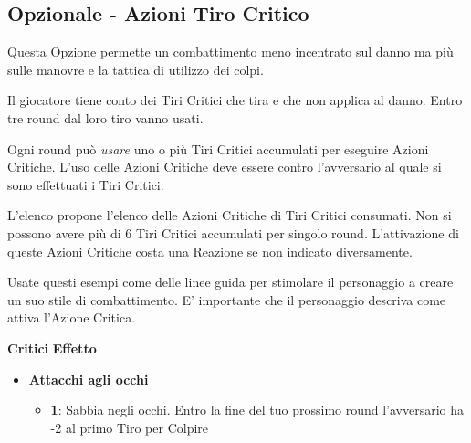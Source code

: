 \begin{multicols}{2}


\subsection{Opzionale - Azioni Tiro Critico}\label{OpzionaleAzioniTiroCritico}\hypertarget{OpzionaleAzioniTiroCritico}{}

Questa Opzione permette un combattimento meno incentrato sul danno ma più sulle manovre e la tattica di utilizzo dei colpi.

Il giocatore tiene conto dei Tiri Critici che tira e che non applica al danno. Entro tre round dal loro tiro vanno usati.

Ogni round può \emph{usare} uno o più Tiri Critici accumulati per eseguire Azioni Critiche. L'uso delle Azioni Critiche deve essere contro l'avversario al quale si sono effettuati i Tiri Critici.

L'elenco propone l'elenco delle Azioni Critiche di Tiri Critici consumati. Non si possono avere più di 6 Tiri Critici accumulati per singolo round.
L'attivazione di queste Azioni Critiche costa una Reazione se non indicato diversamente.

Usate questi esempi come delle linee guida per stimolare il personaggio a creare un suo stile di combattimento. E' importante che il personaggio descriva come attiva l'Azione Critica.

\medskip

\noindent\textbf{Critici} \hskip 0.5cm \textbf{Effetto}

\medskip

\begin{itemize}[leftmargin=*]
	\setlength{\itemsep}{0pt}

	\item \textbf{Attacchi agli occhi}
	\begin{itemize}[leftmargin=*]
		\setlength{\itemsep}{0pt}
		\item \textbf{1}: Sabbia negli occhi. Entro la fine del tuo prossimo round l'avversario ha -2 al primo Tiro per Colpire


\end{itemize}
\end{itemize}
\end{multicols}

